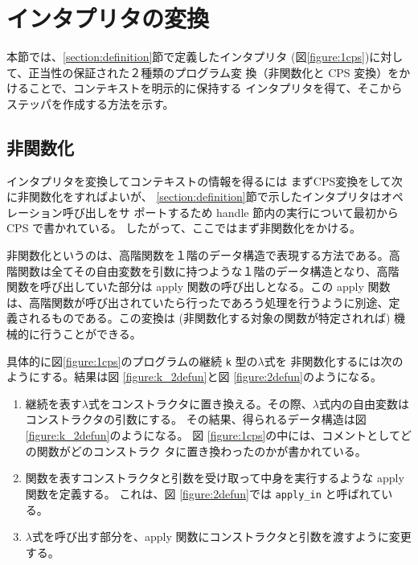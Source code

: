 \section{インタプリタの変換}
\label{section:transform}

本節では、\ref{section:definition}節で定義したインタプリタ
(図\ref{figure:1cps})に対して、正当性の保証された２種類のプログラム変
換（非関数化と CPS 変換）をかけることで、コンテキストを明示的に保持する
インタプリタを得て、そこからステッパを作成する方法を示す。

\subsection{非関数化}
\label{section:2defun}

インタプリタを変換してコンテキストの情報を得るには
まずCPS変換をして次に非関数化をすればよいが、
\ref{section:definition}節で示したインタプリタはオペレーション呼び出しをサ
ポートするため handle 節内の実行について最初から CPS で書かれている。
したがって、ここではまず非関数化をかける。

非関数化というのは、高階関数を１階のデータ構造で表現する方法である。高
階関数は全てその自由変数を引数に持つような１階のデータ構造となり、高階
関数を呼び出していた部分は apply 関数の呼び出しとなる。この apply 関数
は、高階関数が呼び出されていたら行ったであろう処理を行うように別途、定
義されるものである。この変換は
(非関数化する対象の関数が特定されれば)
機械的に行うことができる。

具体的に図\ref{figure:1cps}のプログラムの継続 \texttt{k} 型の$\lambda$式を
非関数化するには次のようにする。結果は図 \ref{figure:k_2defun}と図 \ref{figure:2defun}のようになる。

\begin{enumerate}
\item 継続を表す$\lambda$式をコンストラクタに置き換える。その際、$\lambda$式内の自由変数はコンストラクタの引数にする。
その結果、得られるデータ構造は図 \ref{figure:k_2defun}のようになる。
図 \ref{figure:1cps}の中には、コメントとしてどの関数がどのコンストラク
タに置き換わったのかが書かれている。
\item 関数を表すコンストラクタと引数を受け取って中身を実行するような apply 関数を定義する。
これは、図 \ref{figure:2defun}では \texttt{apply\_in} と呼ばれている。
\item $\lambda$式を呼び出す部分を、apply 関数にコンストラクタと引数を渡すように変更する。
\end{enumerate}


